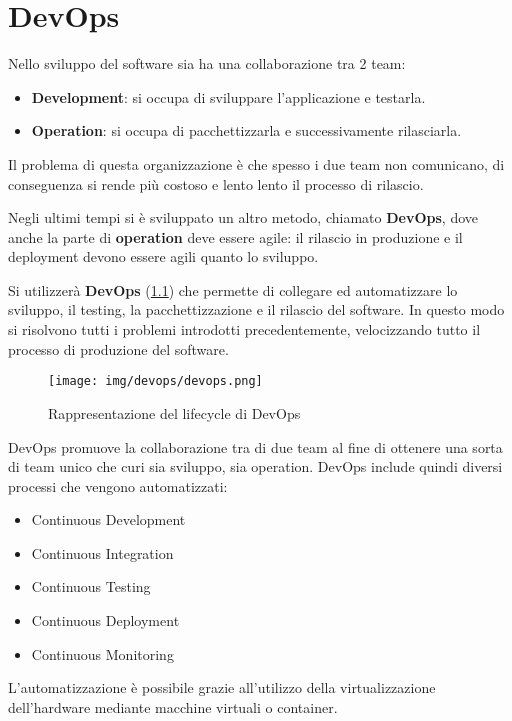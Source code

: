 \chapter{DevOps}
Nello sviluppo del software sia ha una collaborazione tra 2 team:
\begin{itemize}
      \item \textbf{Development}: si occupa di sviluppare l'applicazione e
            testarla.
      \item \textbf{Operation}: si occupa di pacchettizzarla e successivamente
            rilasciarla.
\end{itemize}
Il problema di questa organizzazione è che spesso i due team non comunicano, di
conseguenza si rende più costoso e lento lento il processo di rilascio.

Negli ultimi tempi si è sviluppato un altro metodo, chiamato \textbf{DevOps},
dove anche la parte di \textbf{operation} deve essere agile: il rilascio in
produzione e il deployment devono essere agili quanto lo sviluppo.

Si utilizzerà \textbf{DevOps} (\ref{fig:devops}) che permette di collegare ed
automatizzare lo sviluppo, il testing, la pacchettizzazione e il rilascio del
software. In questo modo si risolvono tutti i problemi introdotti precedentemente,
velocizzando tutto il processo di produzione del software.
\begin{figure}[!ht]
      \centering
      \texttt{[image: img/devops/devops.png]}
      \caption{Rappresentazione del lifecycle di DevOps}
      \label{fig:devops}
\end{figure}
DevOps promuove la collaborazione tra di due team al fine di ottenere una sorta
di team unico che curi sia sviluppo, sia operation. DevOps include quindi diversi
processi che vengono automatizzati:
\begin{itemize}
      \item Continuous Development
      \item Continuous Integration
      \item Continuous Testing
      \item Continuous Deployment
      \item Continuous Monitoring
\end{itemize}
L'automatizzazione è possibile grazie all'utilizzo della virtualizzazione
dell'hardware mediante macchine virtuali o container.

